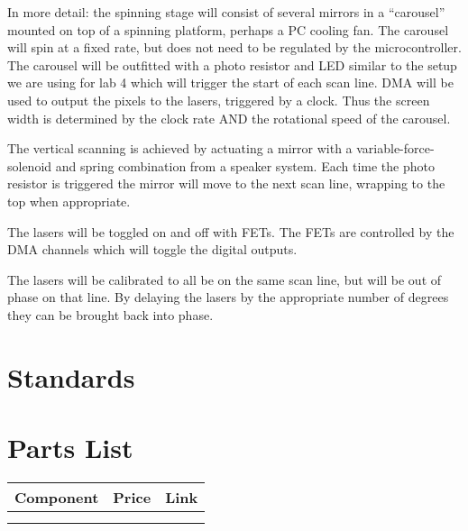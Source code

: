\documentclass[10pt]{article}
\begin{document}
In more detail: the spinning stage will consist of several mirrors in a ``carousel'' mounted on top of a spinning platform, perhaps a PC cooling fan.
The carousel will spin at a fixed rate, but does not need to be regulated by the microcontroller.
The carousel will be outfitted with a photo resistor and LED similar to the setup we are using for lab 4 which will trigger the start of each scan line.
DMA will be used to output the pixels to the lasers, triggered by a clock.
Thus the screen width is determined by the clock rate AND the rotational speed of the carousel.

The vertical scanning is achieved by actuating a mirror with a variable-force-solenoid and spring combination from a speaker system.
Each time the photo resistor is triggered the mirror will move to the next scan line, wrapping to the top when appropriate.

The lasers will be toggled on and off with FETs.
The FETs are controlled by the DMA channels which will toggle the digital outputs.

The lasers will be calibrated to all be on the same scan line, but will be out of phase on that line.
By delaying the lasers by the appropriate number of degrees they can be brought back into phase.

\section{Standards}

\section{Parts List}

\begin{tabular}{lll}
\hline
Component & Price & Link\\
\hline
 &  & \\
 &  & \\
\end{tabular}
\begin{comment}
  #+ORGTBL: SEND component-table orgtbl-to-latex
  |-----------+-------+------|
  | Component | Price | Link |
  |-----------+-------+------|
  |           |       |      |
  |           |       |      |
\end{comment}
\end{document}
